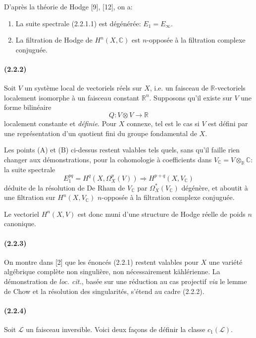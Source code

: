 \documentclass[10pt]{article}
\newcommand{\C}{\mathbb C}
\newcommand{\R}{\mathbb R}
\providecommand{\cL}{\mathcal L}
\providecommand{\cL}{\mathcal L}
\begin{document}
D'après la théorie de Hodge [9], [12], on a:
\begin{enumerate}[label=(\Alph*)]
\item La suite spectrale (2.2.1.1) est dégénérée: $E_1=E_\infty$.
\item La filtration de Hodge de $H^n(X,\C)$ est $n$-opposée à la filtration complexe conjuguée.
\end{enumerate}

\paragraph{(2.2.2)} Soit $V$ un système local de vectoriels réels sur $X$, i.e. un faisceau de $\R$-vectoriels localement isomorphe à un faisceau constant $\R^n$. Supposons qu'il existe sur $V$ une forme bilinéaire
\[
Q:V\otimes V\longrightarrow\R
\]
localement constante et \emph{définie}. Pour $X$ connexe, tel est le cas si $V$ est défini par une représentation d'un quotient fini du groupe fondamental de $X$.

Les points (A) et (B) ci-dessus restent valables tels quels, sans qu'il faille rien changer aux démonstrations, pour la cohomologie à coefficients dans $V_\C=V\otimes_\R\C$: la suite spectrale
\[
E_1^{pq}=H^q(X,\Omega_X^p(V))\Rightarrow H^{p+q}(X,V_\C)
\]
déduite de la résolution de De Rham de $V_\C$ par $\Omega_X^*(V_\C)$ dégénère, et aboutit à une filtration sur $H^n(X,V_\C)$ $n$-opposée à la filtration complexe conjuguée.

Le vectoriel $H^n(X,V)$ est donc muni d'une structure de Hodge réelle de poids $n$ canonique.

\paragraph{(2.2.3)} On montre dans [2] que les énoncés (2.2.1) restent valables pour $X$ une variété algébrique complète non singulière, non nécessairement kählérienne. La démonstration de \emph{loc. cit.}, basée sur une réduction au cas projectif \emph{via} le lemme de Chow et la résolution des singularités, s'étend au cadre (2.2.2).

\paragraph{(2.2.4)} Soit $\cL$ un faisceau inversible. Voici deux façons de définir la classe $c_1(\cL)$.
\end{document}
